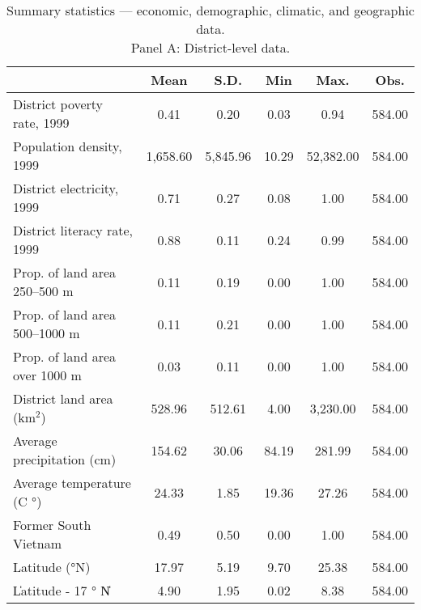 \begin{table}[htbp]\centering
\def\sym#1{\ifmmode^{#1}\else\(^{#1}\)\fi}
\caption{Summary statistics — economic, demographic, climatic, and geographic data. \\ Panel A: District-level data.}
\begin{tabular}{l*{1}{ccccc}}
\toprule
                    &        Mean&        S.D.&         Min&        Max.&        Obs.\\
\midrule
District poverty rate, 1999&        0.41&        0.20&        0.03&        0.94&      584.00\\
Population density, 1999&    1,658.60&    5,845.96&       10.29&   52,382.00&      584.00\\
District electricity, 1999&        0.71&        0.27&        0.08&        1.00&      584.00\\
District literacy rate, 1999&        0.88&        0.11&        0.24&        0.99&      584.00\\
Prop. of land area 250–500 m&        0.11&        0.19&        0.00&        1.00&      584.00\\
Prop. of land area 500–1000 m&        0.11&        0.21&        0.00&        1.00&      584.00\\
Prop. of land area over 1000 m&        0.03&        0.11&        0.00&        1.00&      584.00\\
District land area (km$^2$)&      528.96&      512.61&        4.00&    3,230.00&      584.00\\
Average precipitation (cm)&      154.62&       30.06&       84.19&      281.99&      584.00\\
Average temperature (C $°$)&       24.33&        1.85&       19.36&       27.26&      584.00\\
Former South Vietnam&        0.49&        0.50&        0.00&        1.00&      584.00\\
Latitude (°N)       &       17.97&        5.19&        9.70&       25.38&      584.00\\
\|Latitude - 17 $°$ N\|&        4.90&        1.95&        0.02&        8.38&      584.00\\
\bottomrule
\end{tabular}
\end{table}
